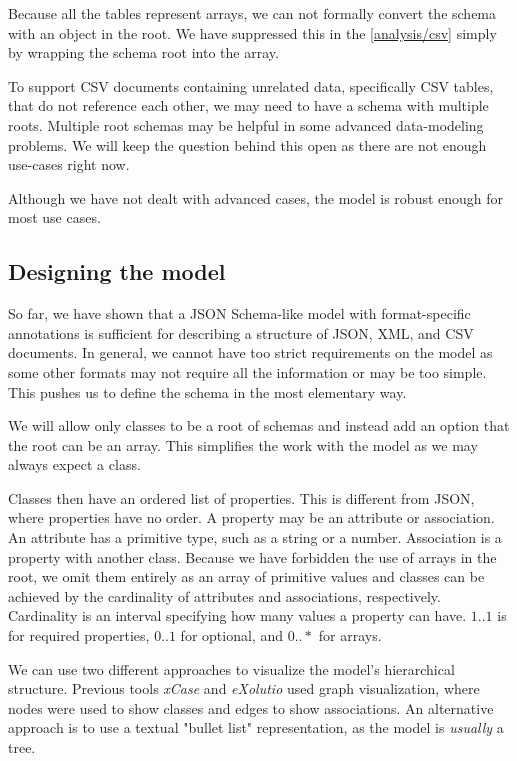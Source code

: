 Because all the tables represent arrays, we can not formally convert the schema with an object in the root. We have suppressed this in the \autoref{analysis/csv} simply by wrapping the schema root into the array.

To support CSV documents containing unrelated data, specifically CSV tables, that do not reference each other, we may need to have a schema with multiple roots. Multiple root schemas may be helpful in some advanced data-modeling problems. We will keep the question behind this open as there are not enough use-cases right now.

Although we have not dealt with advanced cases, the model is robust enough for most use cases.

\subsection*{Designing the model}

So far, we have shown that a JSON Schema-like model with format-specific annotations is sufficient for describing a structure of JSON, XML, and CSV documents. In general, we cannot have too strict requirements on the model as some other formats may not require all the information or may be too simple. This pushes us to define the schema in the most elementary way.

\medskip

We will allow only classes to be a root of schemas and instead add an option that the root can be an array. This simplifies the work with the model as we may always expect a class.

Classes then have an ordered list of properties. This is different from JSON, where properties have no order. A property may be an attribute or association. An attribute has a primitive type, such as a string or a number. Association is a property with another class. Because we have forbidden the use of arrays in the root, we omit them entirely as an array of primitive values and classes can be achieved by the cardinality of attributes and associations, respectively. Cardinality is an interval specifying how many values a property can have. $1..1$ is for required properties, $0..1$ for optional, and $0..*$ for arrays.

\smallskip

We can use two different approaches to visualize the model's hierarchical structure. Previous tools \textit{xCase} and \textit{eXolutio} used graph visualization, where nodes were used to show classes and edges to show associations. An alternative approach is to use a textual "bullet list" representation, as the model is \textit{usually} a tree.

